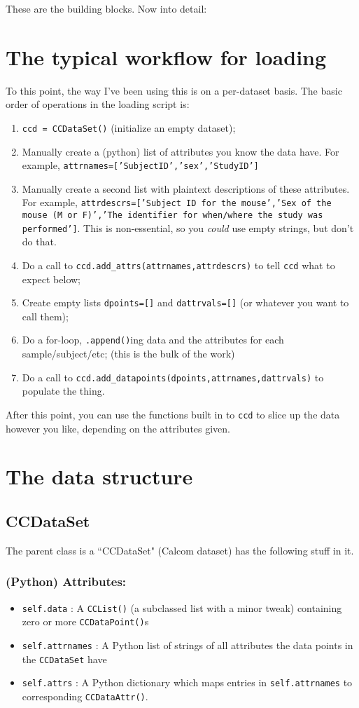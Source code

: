 \documentclass{article}
\newcommand{\ttt}{\texttt}
\begin{document}
These are the building blocks. Now into detail:

\section{The typical workflow for loading}
To this point, the way I've been using this is on a per-dataset basis. The
basic order of operations in the loading script is:
%
\begin{enumerate}
\item \ttt{ccd = CCDataSet()} (initialize an empty dataset);
\item Manually create a (python) list of attributes you know the data have.
For example, \ttt{attrnames=['SubjectID','sex','StudyID']}
\item Manually create a second list with plaintext descriptions of these attributes.
For example, \ttt{attrdescrs=['Subject ID for the mouse','Sex of the mouse (M or F)','The identifier for when/where the study was performed']}.
This is non-essential, so you \emph{could} use empty strings, but don't do that.
\item Do a call to \ttt{ccd.add\_attrs(attrnames,attrdescrs)} to tell \ttt{ccd} what to expect below;
\item Create empty lists \ttt{dpoints=[]} and \ttt{dattrvals=[]} (or whatever you want to call them);
\item Do a for-loop, \ttt{.append()}ing data and the attributes for each sample/subject/etc; (this is
the bulk of the work)
\item Do a call to \ttt{ccd.add\_datapoints(dpoints,attrnames,dattrvals)} to populate the thing.
\end{enumerate}
%
After this point, you can use the functions built in to \ttt{ccd} to slice up the data
however you like, depending on the attributes given.

\section{The data structure}

\subsection{CCDataSet}
The parent class is a ``CCDataSet" (Calcom dataset) has the following
stuff in it.

\subsubsection{(Python) Attributes:}
%
\begin{itemize}
\item \ttt{self.data} : A \ttt{CCList()} (a subclassed list with a minor tweak) containing zero or more \ttt{CCDataPoint()}s
\item \ttt{self.attrnames} : A Python list of strings of all attributes the data points in the \ttt{CCDataSet} have
\item \ttt{self.attrs} : A Python dictionary which maps entries in \texttt{self.attrnames} to corresponding \ttt{CCDataAttr()}.
\end{itemize}
%
\end{document}
